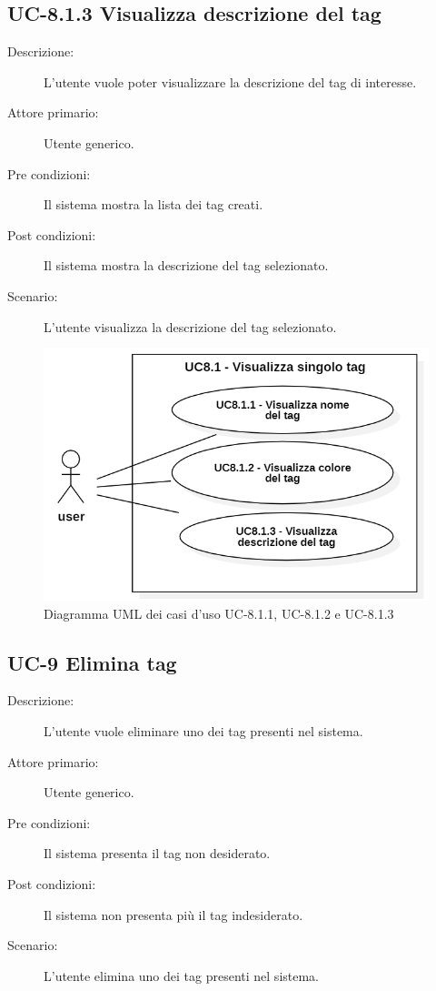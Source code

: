 \subsection{UC-8.1.3 Visualizza descrizione del tag}
\begin{description}
    \item[Descrizione:] L’utente vuole poter visualizzare la descrizione del tag di interesse.
    \item[Attore primario:] Utente generico.
    \item[Pre condizioni:] Il sistema mostra la lista dei tag creati.
    \item[Post condizioni:] Il sistema mostra la descrizione del tag selezionato.
    \item[Scenario:] L'utente visualizza la descrizione del tag selezionato.
\end{description}

\begin{figure}[H]
    \centering
    \includegraphics[width=0.8\linewidth]{UC8.1.1-2-3.PNG}
    \caption{Diagramma UML dei casi d'uso UC-8.1.1, UC-8.1.2 e UC-8.1.3}
    \label{fig:UC8.1.1-2-3}
\end{figure}

\subsection{UC-9 Elimina tag}
\begin{description}
    \item[Descrizione:] L'utente vuole eliminare uno dei tag presenti nel sistema.
    \item[Attore primario:] Utente generico.
    \item[Pre condizioni:] Il sistema presenta il tag non desiderato.
    \item[Post condizioni:] Il sistema non presenta più il tag indesiderato.
    \item[Scenario:] L'utente elimina uno dei tag presenti nel sistema.
\end{description}

